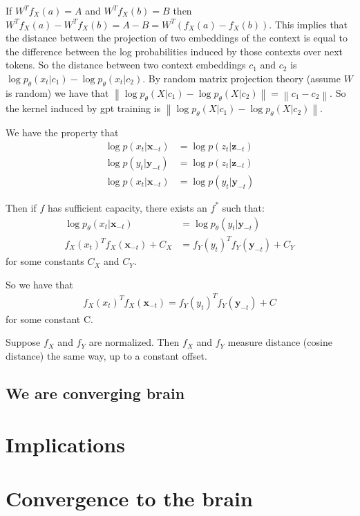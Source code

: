 \documentclass{article}
\theoremstyle{plain}
\theoremstyle{definition}
\theoremstyle{remark}
\newcommand{\norm}[1]{\left\lVert#1\right\rVert}
\begin{document}
If $W^T f_X(a) = A$ and $W^T f_X(b) = B$ then $W^T f_X(a) - W^T f_X(b) = A-B = W^T (f_X(a) - f_X(b))$. This implies that the distance between the projection of two embeddings of the context is equal to the difference between the log probabilities induced by those contexts over next tokens. So the distance between two context embeddings $c_1$ and $c_2$ is $\log p_{\theta}(x_t | c_1) - \log p_{\theta}(x_t | c_2)$. By random matrix projection theory (assume $W$ is random) we have that $\norm{\log p_{\theta}(X | c_1) - \log p_{\theta}(X | c_2)} = \norm{c_1 - c_2}$. So the kernel induced by gpt training is $\norm{\log p_{\theta}(X | c_1) - \log p_{\theta}(X | c_2)}$.

We have the property that 
\begin{align}
     \log p(x_t | \mathbf{x}_{-t}) &=  \log p(z_t | \mathbf{z}_{-t})\\
     \log p(y_t | \mathbf{y}_{-t}) &=  \log p(z_t | \mathbf{z}_{-t})\\
     \log p(x_t | \mathbf{x}_{-t}) &=  \log p(y_t | \mathbf{y}_{-t})
\end{align}

Then if $f$ has sufficient capacity, there exists an $f^*$ such that:
\begin{align}
    \log p_\theta(x_t | \mathbf{x}_{-t}) &= \log p_\theta(y_t | \mathbf{y}_{-t})\\
    f_X(x_t)^Tf_X(\mathbf{x}_{-t}) + C_X &= f_Y(y_t)^Tf_Y(\mathbf{y}_{-t}) + C_Y
\end{align}
for some constants $C_X$ and $C_Y$.

So we have that
\begin{align}
    f_X(x_t)^Tf_X(\mathbf{x}_{-t}) = f_Y(y_t)^Tf_Y(\mathbf{y}_{-t}) + C
\end{align}
for some constant C.

Suppose $f_X$ and $f_Y$ are normalized. Then $f_X$ and $f_Y$ measure distance (cosine distance) the same way, up to a constant offset.

\subsection{We are converging brain}

\section{Implications}



\section{Convergence to the brain}
\end{document}
